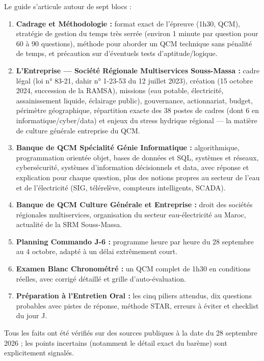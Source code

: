 Le guide s'articule autour de sept blocs :
\begin{enumerate}[label=\textbf{\arabic*.}]
    \item \textbf{Cadrage et Méthodologie :} format exact de l'épreuve (1h30, QCM), stratégie de gestion du temps très serrée (environ 1 minute par question pour 60 à 90 questions), méthode pour aborder un QCM technique sans pénalité de temps, et précaution sur d'éventuels tests d'aptitude/logique.
    \item \textbf{L'Entreprise --- Société Régionale Multiservices Souss-Massa :} cadre légal (loi n° 83-21, dahir n° 1-23-53 du 12 juillet 2023), création (15 octobre 2024, succession de la RAMSA), missions (eau potable, électricité, assainissement liquide, éclairage public), gouvernance, actionnariat, budget, périmètre géographique, répartition exacte des 38 postes de cadres (dont 6 en informatique/cyber/data) et enjeux du stress hydrique régional --- la matière de \og culture générale entreprise \fg{} du QCM.
    \item \textbf{Banque de QCM Spécialité Génie Informatique :} algorithmique, programmation orientée objet, bases de données et SQL, systèmes et réseaux, cybersécurité, systèmes d'information décisionnels et data, avec réponse et explication pour chaque question, plus des notions propres au secteur de l'eau et de l'électricité (SIG, télérelève, compteurs intelligents, SCADA).
    \item \textbf{Banque de QCM Culture Générale et Entreprise :} droit des sociétés régionales multiservices, organisation du secteur eau-électricité au Maroc, actualité de la SRM Souss-Massa.
    \item \textbf{Planning Commando J-6 :} programme heure par heure du 28 septembre au 4 octobre, adapté à un délai extrêmement court.
    \item \textbf{Examen Blanc Chronométré :} un QCM complet de 1h30 en conditions réelles, avec corrigé détaillé et grille d'auto-évaluation.
    \item \textbf{Préparation à l'Entretien Oral :} les cinq piliers attendus, dix questions probables avec pistes de réponse, méthode STAR, erreurs à éviter et checklist du jour J.
\end{enumerate}

Tous les faits ont été vérifiés sur des sources publiques à la date du 28 septembre 2026 ; les points incertains (notamment le détail exact du barème) sont explicitement signalés.
